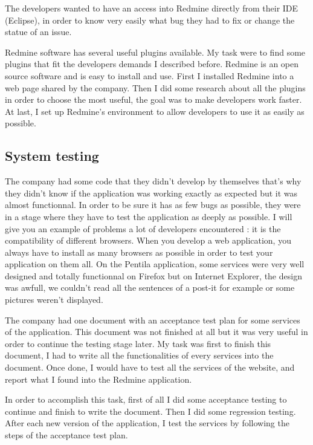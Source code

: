 The developers wanted to have an access into Redmine directly from their IDE (Eclipse), 
in order to know very easily what bug they had to fix or change the statue of an issue.

Redmine software has several useful plugins available. My task were to find some plugins that fit the 
developers demands I described before. 
Redmine is an open source software and is easy to install and use. 
First I installed Redmine into a web page shared by the company.  
Then I did some research about all the plugins in order to choose the most useful, 
the goal was to make developers work faster. 
At last, I set up Redmine's environment to allow developers to use it as easily as possible. 





\newpage
\subsection{System testing}
The company had some code that they didn't develop by themselves that's why they didn't 
know if the application was working exactly as expected but it was almost functionnal. 
In order to be sure it has as few bugs as possible, they were in a stage where they 
have to test the application as deeply as possible.  
I will give you an example of problems a lot of developers encountered : it is the 
compatibility of different browsers. When you develop a web application, you always have to
install as many browsers as possible in order to test your application on them all.
On the Pentila application, some services were very well designed and totally functionnal
 on Firefox but on Internet Explorer, the design was awfull, we couldn't read all the 
 sentences of a post-it for example or some pictures weren't displayed. 


The company had one document with an acceptance test plan for some services of the 
application. This document was not finished at all but it was very useful in order 
to continue the testing stage later. 
My task was first to finish this document, I had to write all the functionalities of every
services into the document. Once done, I would have to test all the services 
of the website, and report what I found into the Redmine application. 

In order to accomplish this task, first of all I did some acceptance testing to continue
 and finish to write the document. Then I did some regression testing. After each new 
 version of the application, I test the services by following the steps of the acceptance 
 test plan. 

